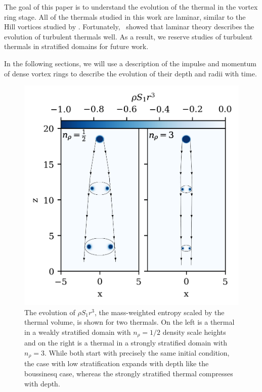 \documentclass[twocolumn, amsmath, amsfonts, amssymb, trackchanges]{aastex62}
\newcommand{\LJ}{\citetalias{lecoanet&jeevanjee2018}}
\begin{document}
The goal of this paper is to understand the evolution of the thermal in the vortex ring stage.
All of the thermals studied in this work are laminar, similar to the Hill vortices studied by \citet{brandenburg2016}.
Fortunately, \LJ\, showed that laminar theory describes the evolution of turbulent thermals well.
As a result, we reserve studies of turbulent thermals in stratified domains for future work.

In the following sections, we will use a description of the impulse and momentum of dense vortex rings to describe the evolution of their depth and radii with time.

\begin{figure}[t!]
    \includegraphics[width=\columnwidth]{evolution_colormeshes.png}
    \caption{
	The evolution of $\rho S_1 r^3$, the mass-weighted entropy scaled by the thermal volume, is shown for two thermals. 
	On the left is a thermal in a weakly stratified domain with $n_\rho = 1/2$ density scale heights and on the right is a thermal in a strongly stratified domain with $n_\rho = 3$.
	While both start with precisely the same initial condition, the case with low stratification expands with depth like the boussinesq case, whereas the strongly stratified thermal compresses with depth.
    \label{fig:evolution_colormeshes} }
\end{figure}
\end{document}
